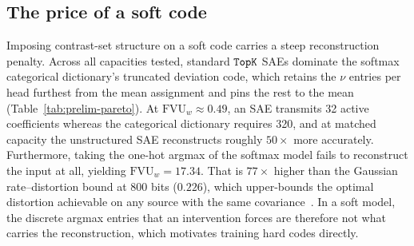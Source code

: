 \subsection{The price of a soft code}
\label{sec:prelim-pareto}
Imposing contrast-set structure on a soft code carries a steep
reconstruction penalty. Across all capacities tested, standard $\mathop{\mathtt{TopK}}\limits$
SAEs dominate the softmax categorical dictionary's truncated deviation
code, which retains the $\nu$ entries per head furthest from the mean
assignment and pins the rest to the mean (Table~\ref{tab:prelim-pareto}).
At $\mathrm{FVU}_w \approx 0.49$, an SAE transmits 32 active coefficients
whereas the categorical dictionary requires 320, and at matched capacity the
unstructured SAE reconstructs roughly $50\times$ more accurately.
Furthermore, taking the one-hot argmax of the softmax model fails to
reconstruct the input at all, yielding $\mathrm{FVU}_w = 17.34$. That is
$77\times$ higher than the Gaussian rate--distortion bound at 800 bits
($0.226$), which upper-bounds the optimal distortion achievable on any
source with the same covariance~\cite{cover2006}. In a soft model, the
discrete argmax entries that an intervention forces are therefore not what
carries the reconstruction, which motivates training hard codes directly.

